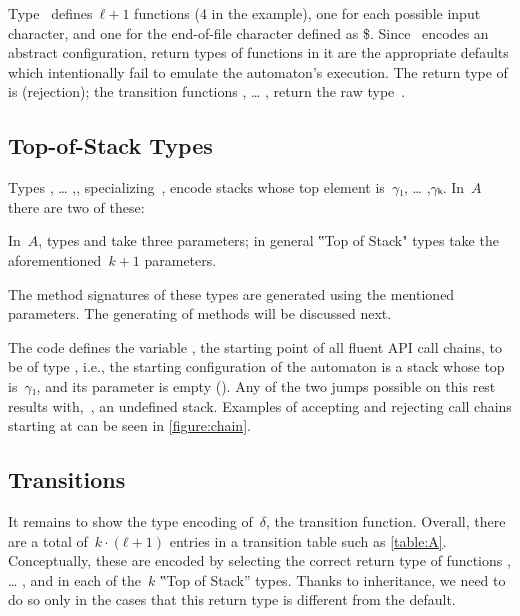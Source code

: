 Type~ defines~$ℓ+1$ functions (4 in the example), one for each possible input character,
  and one for the end-of-file character defined as \$.
Since~ encodes an abstract configuration, return types of functions in it
  are the appropriate defaults which intentionally fail to emulate the automaton's execution.
  The return type of \cc{\$()} is  (rejection);
  the transition functions , … , return the raw type~.

\subsection{Top-of-Stack Types}

Types , … ,, specializing~,
  encode stacks whose top element is~$γ₁$, … ,$γₖ$.
In~$A$ there are two of these:
\begin{quote}
\end{quote}

In~$A$, types  and  take three parameters;
in general ‟Top of Stack" types take the aforementioned~$k+1$ parameters.

\begin{figure*}
  \caption{\label{figure:chain} Accepting and non-accepting call chains with the
  type encoding of jDPDA~$A$ (as defined in \cref{table:A}).
  All lines in  type-check, while all lines in  do not type-check.}
\end{figure*}

The method signatures of these types are generated using the mentioned parameters.
The generating of methods will be discussed next.

The code defines the  variable , the starting point
of all fluent API call chains, to be of type , i.e.,
  the starting configuration of the automaton is a stack whose top is~$γ₁$,
  and its  parameter is empty ().
Any of the two jumps possible on this rest results with,~,
  an undefined stack.
Examples of accepting and rejecting call chains starting at 
  can be seen in \cref{figure:chain}.

\subsection{Transitions}
It remains to show the type encoding of~$δ$,
  the transition function.
Overall, there are a total of~$k·(ℓ+1)$
  entries in a transition table such as \cref{table:A}.
Conceptually, these are encoded by selecting the correct return
  type of functions , … , and \cc{\$()} in each
  of the~$k$ ‟Top of Stack” types.
Thanks to inheritance, we need to do so only in the cases that this
  return type is different from the default.

